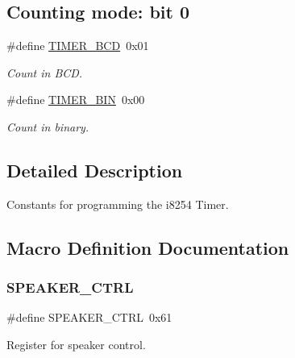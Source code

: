 \subsection*{Counting mode\+: bit 0}
\begin{DoxyCompactItemize}
\item 
\#define \hyperlink{group__i8254_ga325b992a371d5d981c4eceff42fa5956}{T\+I\+M\+E\+R\+\_\+\+B\+CD}~0x01
\begin{DoxyCompactList}\small\item\em Count in B\+CD. \end{DoxyCompactList}\item 
\#define \hyperlink{group__i8254_gad2913dcf2f91453317bd035589ac0a7d}{T\+I\+M\+E\+R\+\_\+\+B\+IN}~0x00
\begin{DoxyCompactList}\small\item\em Count in binary. \end{DoxyCompactList}\end{DoxyCompactItemize}


\subsection{Detailed Description}
Constants for programming the i8254 Timer. 

\subsection{Macro Definition Documentation}
\hypertarget{group__i8254_ga51b3a5e3d4811ca063fe25e35560ab40}{}\label{group__i8254_ga51b3a5e3d4811ca063fe25e35560ab40} 
\subsubsection{\texorpdfstring{S\+P\+E\+A\+K\+E\+R\+\_\+\+C\+T\+RL}{SPEAKER\_CTRL}}
{\footnotesize\ttfamily \#define S\+P\+E\+A\+K\+E\+R\+\_\+\+C\+T\+RL~0x61}



Register for speaker control. 

\hypertarget{group__i8254_ga30bf84c312af248cb81bb224e09f9ba8}{}\label{group__i8254_ga30bf84c312af248cb81bb224e09f9ba8} 

